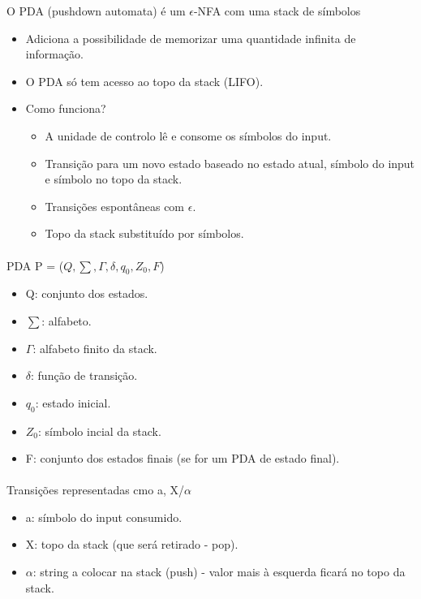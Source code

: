\documentclass[../resumosTCOM.tex]{subfiles}
\begin{document}
 

O PDA (pushdown automata) é um $\epsilon$-NFA com uma stack de símbolos
\begin{itemize}
    \item Adiciona a possibilidade de memorizar uma quantidade infinita de informação.
    \item O PDA só tem acesso ao topo da stack (LIFO).
    \item Como funciona?
    \begin{itemize}
        \item A unidade de controlo lê e consome os símbolos do input.
        \item Transição para um novo estado baseado no estado atual, símbolo do input e símbolo no topo da stack.
        \item Transições espontâneas com $\epsilon$.
        \item Topo da stack substituído por símbolos.
    \end{itemize}
\end{itemize}

\paragraph{}

PDA P = (\(Q, \sum, \Gamma, \delta, q_0, Z_0, F\))
\begin{itemize}
    \item Q: conjunto dos estados.
    \item $\sum$: alfabeto.
    \item $\Gamma$: alfabeto finito da stack.
    \item $\delta$: função de transição.
    \item $q_0$: estado inicial.
    \item $Z_0$: símbolo incial da stack.
    \item F: conjunto dos estados finais (se for um PDA de estado final).
\end{itemize}

\paragraph{}

Transições representadas cmo a, X/$\alpha$
\begin{itemize}
    \item a: símbolo do input consumido.
    \item X: topo da stack (que será retirado - pop).
    \item $\alpha$: string a colocar na stack (push) - valor mais à esquerda ficará no topo da stack.
\end{itemize}
\end{document}
